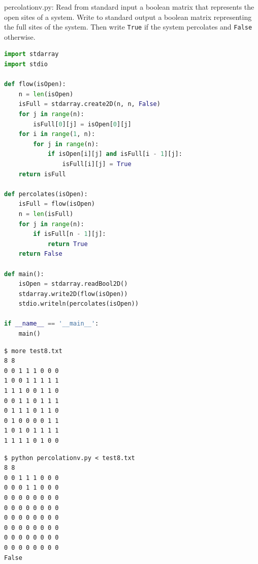 \documentclass[8pt,a4paper,compress]{beamer}
\begin{document}
\begin{frame}[fragile]
\pause

\begin{framed}
\tiny percolationv.py: Read from standard input a boolean matrix that represents the open sites of a system. Write to standard output a boolean matrix representing the full sites of the system. Then write \lstinline{True} if the system percolates and \lstinline{False} otherwise.
\end{framed}

\begin{lstlisting}[language=Python]
import stdarray
import stdio

def flow(isOpen):
    n = len(isOpen)
    isFull = stdarray.create2D(n, n, False)
    for j in range(n):
        isFull[0][j] = isOpen[0][j]
    for i in range(1, n):
        for j in range(n):
            if isOpen[i][j] and isFull[i - 1][j]:
                isFull[i][j] = True
    return isFull

def percolates(isOpen):
    isFull = flow(isOpen)
    n = len(isFull)
    for j in range(n):
        if isFull[n - 1][j]:
            return True
    return False

def main():
    isOpen = stdarray.readBool2D()
    stdarray.write2D(flow(isOpen))
    stdio.writeln(percolates(isOpen))
    
if __name__ == '__main__':
    main()
\end{lstlisting}
\end{frame}

\begin{frame}[fragile]
\pause

\begin{lstlisting}[language={}]
$ more test8.txt 
8 8
0 0 1 1 1 0 0 0
1 0 0 1 1 1 1 1
1 1 1 0 0 1 1 0
0 0 1 1 0 1 1 1
0 1 1 1 0 1 1 0
0 1 0 0 0 0 1 1
1 0 1 0 1 1 1 1
1 1 1 1 0 1 0 0
\end{lstlisting}

\pause

\begin{lstlisting}[language={}]
$ python percolationv.py < test8.txt 
8 8
0 0 1 1 1 0 0 0 
0 0 0 1 1 0 0 0 
0 0 0 0 0 0 0 0 
0 0 0 0 0 0 0 0 
0 0 0 0 0 0 0 0 
0 0 0 0 0 0 0 0 
0 0 0 0 0 0 0 0 
0 0 0 0 0 0 0 0 
False
\end{lstlisting}
\end{frame}
\end{document}
